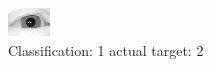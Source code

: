 \begin{figure}[h!]
\begin{center}
\includegraphics[width=0.60\columnwidth]{figures/ID3077_class_1_target_2.png}
\end{center}
\caption{ Classification: 1 actual target: 2}
\label{fig:ID3077_class_1_target_2}
\end{figure}
